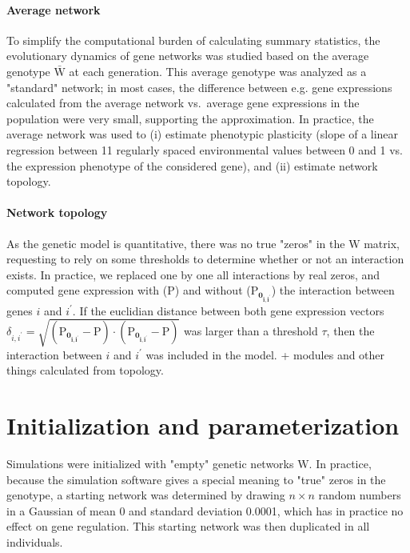\documentclass{article}
\begin{document}
\paragraph{Average network} To simplify the computational burden of calculating summary statistics, the evolutionary dynamics of gene networks was studied based on the average genotype $\bar{\bm{\mathrm W}}$ at each generation. This average genotype was analyzed as a "standard" network; in most cases, the difference between e.g. gene expressions calculated from the average network vs.\ average gene expressions in the population were very small, supporting the approximation. In practice, the average network was used to (i) estimate phenotypic plasticity (slope of a linear regression between 11 regularly spaced environmental values between 0 and 1 vs. the expression phenotype of the considered gene), and (ii) estimate network topology. 

\paragraph{Network topology} As the genetic model is quantitative, there was no true "zeros" in the $\bm{\mathrm W}$ matrix, requesting to rely on some thresholds to determine whether or not an interaction exists. In practice, we replaced one by one all interactions by real zeros, and computed gene expression with ($\bm{\mathrm P}$) and without ($\bm{\mathrm P_{0_{i,i^\prime}}}$) the interaction between genes $i$ and $i^\prime$. If the euclidian distance between both gene expression vectors $\delta_{i,i^\prime} = \sqrt{(\bm{\mathrm  P_{0_{i,i^\prime}}} - \bm{\mathrm P}) \cdot (\bm{\mathrm  P_{0_{i,i^\prime}}} - \bm{\mathrm P})}$ was larger than a threshold $\tau$, then the interaction between $i$ and $i^\prime$ was included in the model. + modules and other things calculated from topology. 

\section{Initialization and parameterization}

Simulations were initialized with "empty" genetic networks $\bm{\mathrm W}$. In practice, because the simulation software gives a special meaning to "true" zeros in the genotype, a starting network was determined by drawing $n \times n$ random numbers in a Gaussian of mean 0 and standard deviation 0.0001, which has in practice no effect on gene regulation. This starting network was then duplicated in all individuals. 
\end{document}
